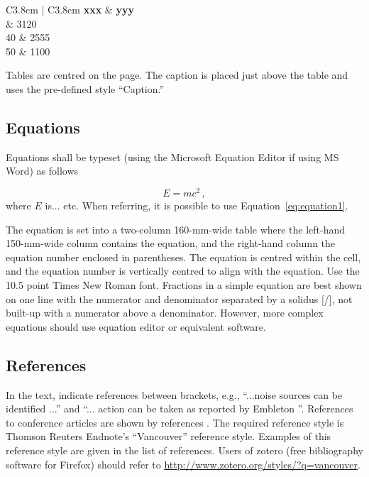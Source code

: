 \begin{table}[H]
  \centering 
  \caption{A second example of table}
	\fontsize{11}{12}\selectfont 
    \begin{tabular}{C{3.8cm} | C{3.8cm}}
    \toprule
    \textbf{ xxx } & \textbf{yyy} \\
	   & 3120\\
		 40	& 2555\\
		50 & 1100\\
    \bottomrule
    \end{tabular}
    \label{tab:table2}
\end{table}%

Tables are centred on the page. The caption is placed just above the table and uses the pre-defined style ``Caption.''

\subsection{Equations}

Equations shall be typeset (using the Microsoft Equation Editor if using MS Word) as follows

\begin{equation}
E = mc^2 \,,
\label{eq:equation1}
\end{equation}
%
where $E$ is... etc. When referring, it is possible to use Equation~\eqref{eq:equation1}.

The equation is set into a two-column 160-mm-wide table where the left-hand 150-mm-wide column contains the equation, and the right-hand column the equation number enclosed in parentheses. The equation is centred within the cell, and the equation number is vertically centred to align with the equation. Use the 10.5 point Times New Roman font. Fractions in a simple equation are best shown on one line with the numerator and denominator separated by a solidus [/], not built-up with a numerator above a denominator. However, more complex equations should use equation editor or equivalent software.

\subsection{References}

In the text, indicate references between brackets, e.g., ``...noise sources can be identified \cite{beranek,adaptive:1985}...'' and ``... action can be taken as reported by Embleton \cite{tutorial:1996}''. References to conference articles are shown by references \cite{active:1994, stinson:1996, Fonseca-2013}. The required reference style is Thomson Reuters Endnote's ``Vancouver'' reference style. Examples of this reference style are given in the list of references. Users of zotero (free bibliography software for Firefox) should refer to \href{http://www.zotero.org/styles/?q=vancouver}{http://www.zotero.org/styles/?q=vancouver}.

